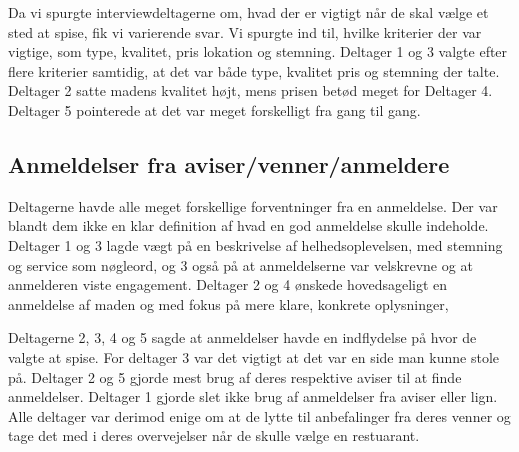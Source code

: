 \documentclass[a4paper, 12pt]{article}
\begin{document}
Da vi spurgte interviewdeltagerne om, hvad der er vigtigt når de skal
vælge et sted at spise, fik vi varierende svar. Vi spurgte ind til,
hvilke kriterier der var vigtige, som type, kvalitet, pris lokation og
stemning. Deltager 1 og 3 valgte efter flere kriterier samtidig, at
det var både type, kvalitet pris og stemning der talte. Deltager 2
satte madens kvalitet højt, mens prisen betød meget for Deltager
4. Deltager 5 pointerede at det var meget forskelligt fra gang til
gang.


\subsection{Anmeldelser fra aviser/venner/anmeldere}

Deltagerne havde alle meget forskellige forventninger fra en anmeldelse. Der var blandt dem ikke en klar definition af hvad en god anmeldelse skulle indeholde. Deltager 1 og 3 lagde vægt på en beskrivelse af helhedsoplevelsen, med stemning og service som nøgleord, og 3 også på at anmeldelserne var velskrevne og at anmelderen viste engagement. Deltager 2 og 4 ønskede hovedsageligt en anmeldelse af maden og med fokus på mere klare, konkrete oplysninger,

Deltagerne 2, 3, 4 og 5 sagde at anmeldelser havde en indflydelse på hvor de valgte at spise. For deltager 3 var det vigtigt at det var en side man kunne stole på. Deltager 2 og 5 gjorde mest brug af deres respektive aviser til at finde anmeldelser. Deltager 1 gjorde slet ikke brug af anmeldelser fra aviser eller lign. Alle deltager var derimod enige om at de lytte til anbefalinger fra deres venner og tage det med i deres overvejelser når de skulle vælge en restuarant.

\end{document}

